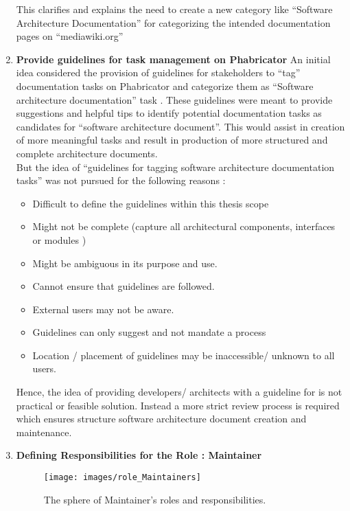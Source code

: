 \begin{enumerate}
This clarifies and explains the need to create a new category like \enquote{Software Architecture Documentation} for categorizing the intended documentation pages on \enquote{mediawiki.org}

\item \textbf{Provide guidelines for task management on Phabricator}
\indent An initial idea considered the provision of guidelines for stakeholders to \enquote{tag} documentation tasks on Phabricator and categorize them as \enquote{Software architecture documentation} task . These guidelines were meant to provide suggestions and helpful tips to identify potential documentation tasks as candidates for \enquote{software architecture document}. This would assist in creation of more meaningful tasks and result in production of more structured and complete architecture documents.
\\\indent But the idea of \enquote{guidelines for tagging software architecture documentation tasks} was not pursued for the following reasons :

\begin{itemize}
\item Difficult to define the guidelines within this thesis scope
\item Might not be complete (capture all architectural components, interfaces or modules )
\item Might be ambiguous in its purpose and use.
\item Cannot ensure that guidelines are followed.
\item External users may not be aware.
\item Guidelines can only suggest and not mandate a process
\item Location / placement of guidelines may be inaccessible/ unknown to all users. 
\end{itemize}
Hence, the idea of providing developers/ architects with a guideline for is not practical or feasible solution. Instead a more strict review process is required which ensures structure software architecture document creation and maintenance.


\item \textbf{Defining Responsibilities for the Role : Maintainer}

\begin{figure}[H]
  \centering
  \texttt{[image: images/role\_Maintainers]}
  \caption[The sphere of Maintainer's roles and responsibilities]{The sphere of Maintainer's roles and responsibilities.}\label{fig:role_Maintainers}
\end{figure}


\end{enumerate}
